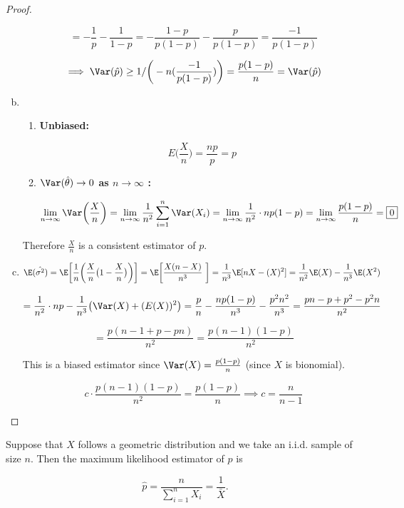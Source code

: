 \begin{proof}
\begin{enumerate}[a.]
\[
= -\frac{1}{p} - \frac{1}{1-p} = -\frac{1-p}{p(1-p)} - \frac{p}{p(1-p)} = \frac{-1}{p(1-p)} 
\]


\[
\implies \Var(\hat{p}) \geq 1 / \bigg( -n( \frac{-1}{p(1-p)}) \bigg) = \frac{p(1-p)}{n} = \Var(\hat{p})
\]

\item \begin{enumerate}[(1)]

\item \textbf{Unbiased:} 

\[
E\bigg( \frac{X}{n} \bigg) = \frac{np}{p} = p
\]

\item \textbf{\(\Var(\hat{\theta}) \to 0\)  as \( n \to \infty\) :}

\[
\lim_{n \to \infty} \Var\bigg( \frac{X}{n} \bigg)  = \lim_{n \to \infty} \frac{1}{n^2} \sum_{i=1}^n \Var(X_i) = \lim_{n \to \infty} \frac{1}{n^2}\cdot n p (1-p) = \lim_{n \to \infty} \frac{p(1-p)}{n} = \boxed{0}
\]

\end{enumerate}

Therefore \(\frac{X}{n} \) is a consistent estimator of \(p\).

\item \[
\E (\hat{\sigma^2}) = \E \bigg[ \frac{1}{n} \bigg( \frac{X}{n} \big( 1 - \frac{X}{n} \big) \bigg) \bigg] = \E \bigg[   \frac{X (n - X)}{n^3}  \ \bigg] = \frac{1}{n^3} \E[nX - (X)^2]  = \frac{1}{n^2} \E(X) - \frac{1}{n^3} \E(X^2)
\]

\[
= \frac{1}{n^2} \cdot np - \frac{1}{n^3}\big( \Var(X) + (E(X))^2 \big) = \frac{p}{n} - \frac{np(1-p)}{n^3} - \frac{p^2n^2}{n^3} = \frac{pn - p + p^2 - p^2n}{n^2}
\]

\[
= \frac{p(n - 1 + p - pn)}{n^2} = \frac{p(n-1)(1-p)}{n^2}
\]

This is a biased estimator since \( \Var(X) = \frac{p(1-p)}{n}\) (since \(X\) is bionomial).

\[
c \cdot \frac{p(n-1)(1-p)}{n^2} =  \frac{p(1-p)}{n} \implies \boxed{c = \frac{n}{n-1}}
\]

\end{enumerate}

\end{proof}

\begin{proposition} Suppose that \(X\) follows a geometric distribution and we take an i.i.d. sample of size \(n\). Then the maximum likelihood estimator of \(p\) is 

\[
\hat{p} = \frac{n}{\sum_{i=1}^n X_i} = \frac{1}{\bar{X}}.
\]

\end{proposition}

